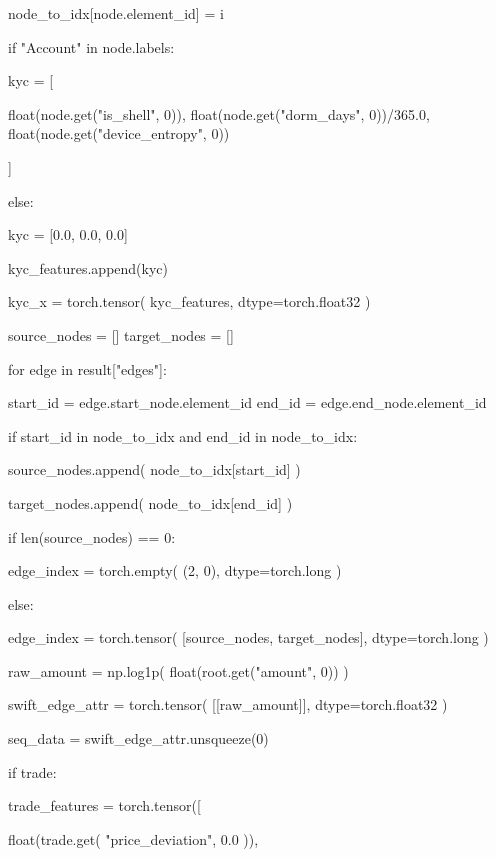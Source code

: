 \begin{tcblisting}
            node_to_idx[node.element_id] = i

            if "Account" in node.labels:

                kyc = [

                    float(node.get("is_shell", 0)),
                    float(node.get("dorm_days", 0))/365.0,
                    float(node.get("device_entropy", 0))

                ]

            else:

                kyc = [0.0, 0.0, 0.0]

            kyc_features.append(kyc)

        kyc_x = torch.tensor(
            kyc_features,
            dtype=torch.float32
        )

        source_nodes = []
        target_nodes = []

        for edge in result["edges"]:

            start_id = edge.start_node.element_id
            end_id = edge.end_node.element_id

            if start_id in node_to_idx and end_id in node_to_idx:

                source_nodes.append(
                    node_to_idx[start_id]
                )

                target_nodes.append(
                    node_to_idx[end_id]
                )

        if len(source_nodes) == 0:

            edge_index = torch.empty(
                (2, 0),
                dtype=torch.long
            )

        else:

            edge_index = torch.tensor(
                [source_nodes, target_nodes],
                dtype=torch.long
            )

        raw_amount = np.log1p(
            float(root.get("amount", 0))
        )

        swift_edge_attr = torch.tensor(
            [[raw_amount]],
            dtype=torch.float32
        )

        seq_data = swift_edge_attr.unsqueeze(0)

        if trade:

            trade_features = torch.tensor([

                float(trade.get(
                    "price_deviation", 0.0
                )),


\end{tcblisting}

